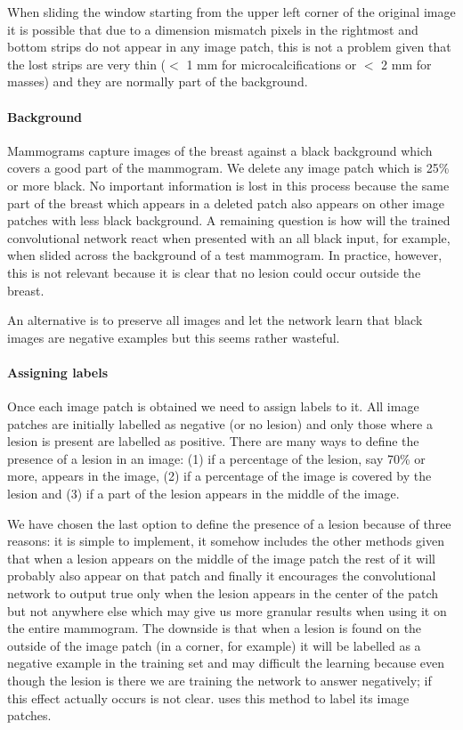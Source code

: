 When sliding the window starting from the upper left corner of the original image it is possible that due to a dimension mismatch pixels in the rightmost and bottom strips do not appear in any image patch, this is not a problem given that the lost strips are very thin ($<$ 1 mm for microcalcifications or  $<$ 2 mm for masses) and they are normally part of the background.

\paragraph{Background}
Mammograms capture images of the breast against a black background which covers a good part of the mammogram. We delete any image patch which is 25\% or more black. No important information is lost in this process because the same part of the breast which appears in a deleted patch also appears on other image patches with less black background. A remaining question is how will the trained convolutional network react when presented with an all black input, for example, when slided across the background of a test mammogram. In practice, however, this is not relevant because it is clear that no lesion could occur outside the breast. 

An alternative is to preserve all images and let the network learn that black images are negative examples but this seems rather wasteful.

\paragraph{Assigning labels}
Once each image patch is obtained we need to assign labels to it. All image patches are initially labelled as negative (or no lesion) and only those where a lesion is present are labelled as positive. There are many ways to define the presence of a lesion in an image: (1) if a percentage of the lesion, say 70\% or more, appears in the image, (2) if a percentage of the image is covered by the lesion and (3) if a part of the lesion appears in the middle of the image.

We have chosen the last option to define the presence of a lesion because of three reasons: it is simple to implement, it somehow includes the other methods given that when a lesion appears on the middle of the image patch the rest of it will probably also appear on that patch and finally it encourages the convolutional network to output true only when the lesion appears in the center of the patch but not anywhere else which may give us more granular results when using it on the entire mammogram. The downside is that when a lesion is found on the outside of the image patch (in a corner, for example) it will be labelled as a negative example in the training set and may difficult the learning because even though the lesion is there we are training the network to answer negatively; if this effect actually occurs is not clear. \cite{Ciresan2013} uses this method to label its image patches.

